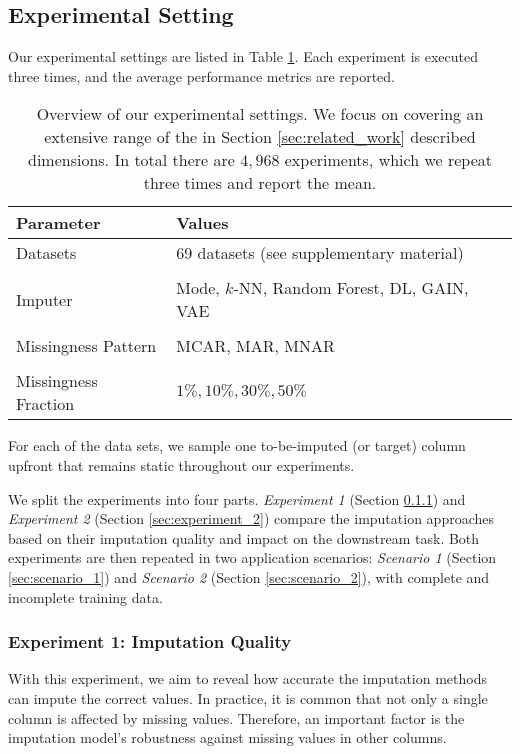 \subsection{Experimental Setting}
%
Our experimental settings are listed in Table \ref{tab:experiment_settings}. Each experiment is executed three times, and the average performance metrics are reported.
%
\begin{table}
	\centering
	\begin{tabular}{ll}
		\toprule
		Parameter            & Values                                     \\ \midrule
		Datasets             & 69 datasets (see supplementary material)    \\
		\\[-0.5em]
		Imputer              & Mode, $k$-NN, Random Forest, DL, GAIN, VAE \\
		\\[-0.5em]
		Missingness Pattern  & MCAR, MAR, MNAR                            \\
		\\[-0.5em]
		Missingness Fraction & $1\%, 10\%, 30\%, 50\%$                      \\ \bottomrule
	\end{tabular}
	\caption{Overview of our experimental settings. We focus on covering an extensive range of the in Section \ref{sec:related_work} described dimensions. In total there are $4,968$ experiments, which we repeat three times and report the mean.}
	\label{tab:experiment_settings}
\end{table}
%
For each of the data sets, we sample one to-be-imputed (or target) column upfront that remains static throughout our experiments.

We split the experiments into four parts. \emph{Experiment 1} (Section \ref{sec:experiment_1}) and \emph{Experiment 2} (Section \ref{sec:experiment_2}) compare the imputation approaches based on their imputation quality and impact on the downstream task. Both experiments are then repeated in two application scenarios: \emph{Scenario 1} (Section \ref{sec:scenario_1}) and \emph{Scenario 2} (Section \ref{sec:scenario_2}), with complete and incomplete training data.


\subsubsection{Experiment 1: Imputation Quality}
\label{sec:experiment_1}
%
With this experiment, we aim to reveal how accurate the imputation methods can impute the correct values. In practice, it is common that not only a single column is affected by missing values. Therefore, an important factor is the imputation model's robustness against missing values in other columns.

